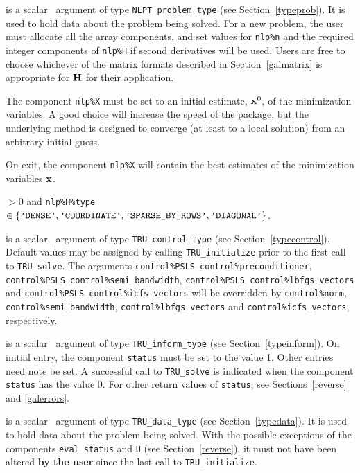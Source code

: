 \documentclass{galahad}
\newcommand{\packagename}{TRU}
\begin{document}
\vspace*{-2mm}
\begin{description}
 is a scalar \intentinout\ argument of type
{\tt NLPT\_problem\_type}
(see Section~\ref{typeprob}).
It is used to hold data about the problem being solved.
For a new problem, the user must allocate all the array components,
and set values for {\tt nlp\%n}
and the required integer components of {\tt nlp\%H} if second derivatives
will be used.
Users are free to choose whichever
of the matrix formats described in Section~\ref{galmatrix}
is appropriate for ${\mathbf{H}}$ for their application.

\noindent
The component {\tt nlp\%X} must be set to an initial estimate, ${\mathbf{x}}^{0}$,
of the minimization variables. A good choice will increase the speed
of the package, but the underlying method is designed to converge (at least
to a local solution) from an arbitrary initial guess.

\noindent
On exit, the component {\tt nlp\%X} will contain the best estimates of the
minimization variables ${\mathbf{x}}$.

\noindent
{} $> 0$ and
{\tt nlp\%H\%type} $\in \{
  \mbox{\tt 'DENSE'}, \mbox{\tt 'COORDINATE'}, \mbox{\tt 'SPARSE\_BY\_ROWS'},
  \mbox{\tt 'DIAGONAL'} \}$.

 is a scalar \intentin\ argument of type
{\tt \packagename\_control\_type}
(see Section~\ref{typecontrol}). Default values may be assigned by calling
{\tt \packagename\_initialize} prior to the first call to
{\tt \packagename\_solve}. The arguments
{\tt control\%PSLS\_control\-\%preconditioner},
{\tt control\%PSLS\_control\%semi\_bandwidth},
{\tt control\%PSLS\_control\%lbfgs\_vectors} and
{\tt control\%PSLS\_control\%icfs\_vectors}
will be overridden by
{\tt control\%norm},
{\tt control\%semi\_bandwidth},
{\tt control\%lbfgs\_vectors} and
{\tt control\%icfs\_vectors}, respectively.

 is a scalar \intentinout\ argument of type
{\tt \packagename\_inform\_type}
(see Section~\ref{typeinform}).
On initial entry, the  component {\tt status} must be set to the value 1.
Other entries need note be set.
A successful call to
{\tt \packagename\_solve}
is indicated when the  component {\tt status} has the value 0.
For other return values of {\tt status}, see Sections~\ref{reverse} and
\ref{galerrors}.

 is a scalar \intentinout\ argument of type
{\tt \packagename\_data\_type}
(see Section~\ref{typedata}). It is used to hold data about the problem being
solved. With the possible exceptions of the components
{\tt eval\_status} and {\tt U} (see Section~\ref{reverse}),
it must not have been altered {\bf by the user} since the last call to
{\tt \packagename\_initialize}.


\end{description}
\end{document}
